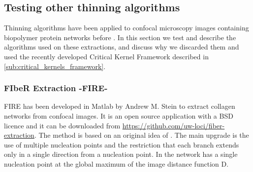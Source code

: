 \subsection{Testing other thinning algorithms}%
\label{sub:testing_other_thinning_algorithms}

Thinning algorithms have been applied to confocal microscopy images containing biopolymer protein networks before \cite{stein_algorithm_2008, lindstrom_biopolymer_2010}.
In this section we test and describe the algorithms used on these extractions, and discuss why we discarded them and used the recently developed Critical Kernel Framework \cite{bertrand_powerful_2014} described in \autoref{sub:critical_kernels_framework}.

\subsubsection{FIbeR Extraction -FIRE-}
\label{subsub:FIRE}

FIRE has been developed in Matlab by Andrew M. Stein
  \citep{stein_mathematical_2007} to extract collagen networks from confocal
  images. It is an open source application with a BSD licence and it can be downloaded from
  \url{https://github.com/uw-loci/fiber-extraction}. The method
  \citep{stein_algorithm_2008} is based on an original idea of
  \citet{wu_automated_2003}. The main upgrade is the use of multiple nucleation
  points  and the restriction that each branch extends only  in a single
  direction from a nucleation point. In \citet{wu_automated_2003} the network has a single nucleation point at the global maximum of the image distance function D.

